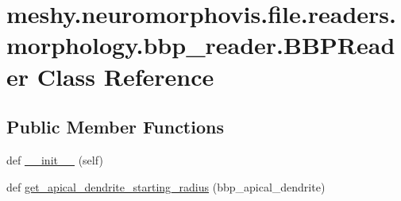 \hypertarget{classmeshy_1_1neuromorphovis_1_1file_1_1readers_1_1morphology_1_1bbp__reader_1_1BBPReader}{}\section{meshy.\+neuromorphovis.\+file.\+readers.\+morphology.\+bbp\+\_\+reader.\+B\+B\+P\+Reader Class Reference}
\label{classmeshy_1_1neuromorphovis_1_1file_1_1readers_1_1morphology_1_1bbp__reader_1_1BBPReader}


 


\subsection*{Public Member Functions}
\begin{DoxyCompactItemize}
\item 
def \hyperlink{classmeshy_1_1neuromorphovis_1_1file_1_1readers_1_1morphology_1_1bbp__reader_1_1BBPReader_a1b19ac4996e04448522b34823155e20a}{\+\_\+\+\_\+init\+\_\+\+\_\+} (self)
\item 
def \hyperlink{classmeshy_1_1neuromorphovis_1_1file_1_1readers_1_1morphology_1_1bbp__reader_1_1BBPReader_a08f5846e432b02df4d878b01e05b6e4c}{get\+\_\+apical\+\_\+dendrite\+\_\+starting\+\_\+radius} (bbp\+\_\+apical\+\_\+dendrite)
\end{DoxyCompactItemize}
